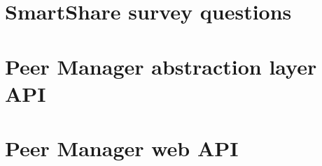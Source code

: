 \documentclass{SmartReport}
\begin{document}


\clearpage
\appendix
\section{SmartShare survey questions} \label{sec:smartshare-survey}


\newpage
\section{Peer Manager abstraction layer API} \label{sec:pm-abs-api-detail}


\newpage
\section{Peer Manager web API} \label{sec:pm-web-api-detail}

\end{document}
